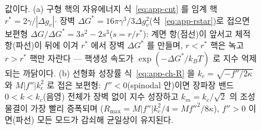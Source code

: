 \begin{figure}[t]
{값이다. (a) 구형 핵의 자유에너지 식~\eqref{eq:app-cnt} 를 임계 핵 $r^\ast=2\gamma/|\Delta g_v|$$\cdot$
장벽 $\Delta G^\ast=16\pi\gamma^3/3\Delta g_v^2$(식~\eqref{eq:app-rstar})로 접으면 보편형
$\Delta G/\Delta G^\ast=3s^2-2s^3$($s{=}r/r^\ast$): 계면 항(점선)이 앞서고 체적 항(파선)이 뒤에 이겨
$r^\ast$ 에서 장벽 $\Delta G^\ast$ 를 만들며, $r<r^\ast$ 핵은 녹고 $r>r^\ast$ 핵만 자란다 --- 핵생성
속도가 $\exp(-\Delta G^\ast/k_BT)$ 로 지수 억제되는 까닭이다. (b) 선형화 성장률 식~\eqref{eq:app-ch-R}
을 $k_c=\sqrt{-f''/2\kappa}$ 와 $M|f''|k_c^2$ 로 접은 보편형: $f''<0$(spinodal 안)이면 장파장 밴드
$0<k<k_c$(음영) 전체가 장벽 없이 지수 성장하고 $k_m=k_c/\sqrt2$ 의 조성 물결이 가장 빨리 증폭되며
($R_{\max}=M|f''|k_c^2/4=Mf''^2/8\kappa$), $f''>0$ 이면(파선) 모든 모드가 감쇠해 균일상이 유지된다.}
\label{fig:cand-ff1-5}
\end{figure}
